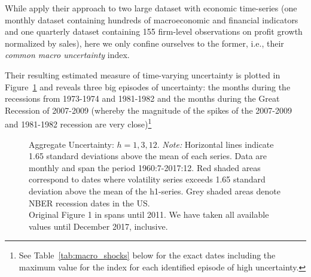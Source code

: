 \documentclass[a4paper,12pt,oneside,pointednumbers,bibtotoc,bigheadings,liststotoc]{scrbook}
\begin{document}
While \citet{juradoetal:15} apply their approach to two large dataset with economic time-series (one monthly dataset containing hundreds of macroeconomic and financial indicators and one quarterly dataset containing 155 firm-level observations on profit growth normalized by sales), here we only confine ourselves to the former, i.e., their \textit{common macro uncertainty} index.

Their resulting estimated measure of time-varying uncertainty is plotted in Figure~\ref{fig:macroUncertainty_index} and reveals three big episodes of uncertainty: the months during the recessions from 1973-1974 and 1981-1982 and the months during the Great Recession of 2007-2009 (whereby the magnitude of the spikes of the 2007-2009 and 1981-1982 recession are very close)\footnote{See Table~\ref{tab:macro_shocks} below for the exact dates including the maximum value for the index for each identified episode of high uncertainty.}

\begin{figure}[!ht]
   \centering
   \setlength\fboxsep{0pt}
   \setlength\fboxrule{0pt}
      \caption[Aggregate Uncertainty: $h = 1, 3, 12$.]{Aggregate Uncertainty: $h = 1, 3, 12$.
      \textit{Note:} Horizontal lines indicate 1.65 standard deviations above the mean of each series. Data are monthly and span the period 1960:7-2017:12. Red shaded areas correspond to dates where volatility series exceeds 1.65 standard deviation above the mean of the h1-series. Grey shaded areas denote NBER recession dates in the US.\\
      Original Figure 1 in \citet{juradoetal:15} spans until 2011. We have taken all available values until December 2017, inclusive.}   \label{fig:macroUncertainty_index}
\end{figure}
\end{document}
